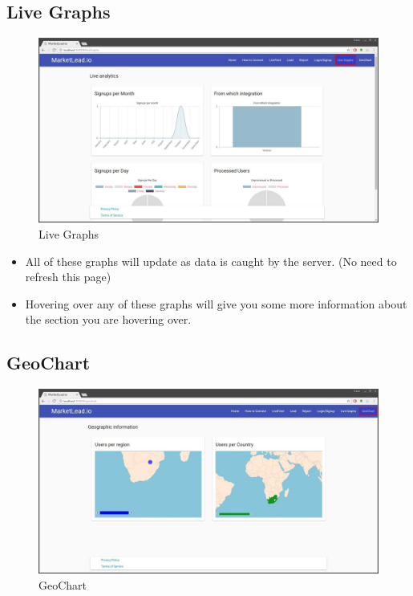 \documentclass{article}
\begin{document}
		\subsection{Live Graphs}
			\begin{figure}[H]
				\includegraphics[width=\textwidth]{images/live_graph.jpg}
				\caption{Live Graphs}
			\end{figure}

			\begin{itemize}
				\item All of these graphs will update as data is caught by the server. (No need to refresh this page)
				\item Hovering over any of these graphs will give you some more information about the section you are hovering over.
			\end{itemize}

		\subsection{GeoChart}
			\begin{figure}[H]
				\includegraphics[width=\textwidth]{images/geo_chart.jpg}
				\caption{GeoChart}
			\end{figure}
\end{document}
